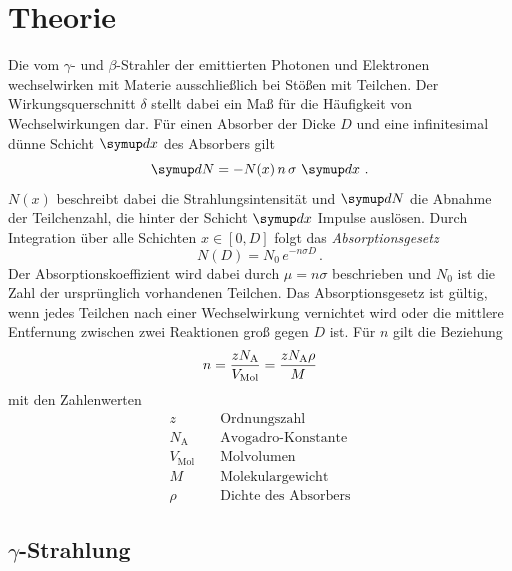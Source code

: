 \section{Theorie}
\label{sec:Theorie}

Die vom $\gamma$- und $\beta$-Strahler der emittierten Photonen und Elektronen
wechselwirken mit Materie ausschließlich bei Stößen mit Teilchen.
Der Wirkungsquerschnitt $\delta$ stellt dabei ein Maß für die Häufigkeit von Wechselwirkungen dar.
Für einen Absorber der Dicke $D$ und eine infinitesimal dünne Schicht $\dif{x}$ des Absorbers gilt
\begin{equation}
    \dif{N} = -N(x) \, n \, \sigma \, \dif{x} \, .
\end{equation}
$N(x)$ beschreibt dabei die Strahlungsintensität und $\dif{N}$ die Abnahme der Teilchenzahl,
die hinter der Schicht $\dif{x}$ Impulse auslösen.
Durch Integration über alle Schichten $x \in [0, D]$ folgt das \textit{Absorptionsgesetz}
\begin{equation} \label{eq:absorptionsgesetz}
    N(D) = N_\text{0} \, e^{-n \sigma D} \, .
\end{equation}
Der Absorptionskoeffizient wird dabei durch $\mu = n \sigma$ beschrieben und 
$N_\text{0}$ ist die Zahl der ursprünglich vorhandenen Teilchen.
Das Absorptionsgesetz ist gültig, wenn jedes Teilchen nach einer Wechselwirkung
vernichtet wird oder die mittlere Entfernung zwischen zwei Reaktionen groß gegen $D$ ist.
Für $n$ gilt die Beziehung
\begin{equation} \label{eq:anzahl}
    n = \frac{z N_\text{A}}{V_\text{Mol}} = \frac{z N_\text{A} \rho}{M} \\
\end{equation}
mit den Zahlenwerten
\begin{align*}
    z                &\quad \text{Ordnungszahl}         \\
    N_\text{A}       &\quad \text{Avogadro-Konstante}   \\
    V_\text{Mol}     &\quad \text{Molvolumen}           \\
    M                &\quad \text{Molekulargewicht}     \\
    \rho             &\quad \text{Dichte des Absorbers} 
\end{align*}


\subsection[Gamma-Strahlung]{$\gamma$-Strahlung}

